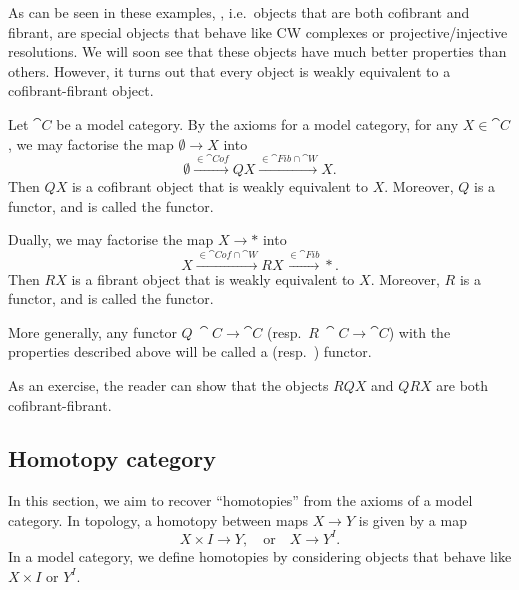As can be seen in these examples, 
, i.e.\ objects that are both cofibrant and fibrant,
are special objects that
behave like CW complexes or projective/injective resolutions.
We will soon see that these objects
have much better properties than others.
However, it turns out that every object
is weakly equivalent to a cofibrant-fibrant object.

\begin{construction}
    Let $\cat C$ be a model category.
    By the axioms for a model category,
    for any $X\in\cat C$, we may factorise the map $\emptyset\to X$ into
    \[ \emptyset\xrightarrow{\in\cat{Cof}}QX\xrightarrow{\in\cat{Fib}\cap\cat{W}}X. \]
    Then $QX$ is a cofibrant object that is weakly equivalent to $X$.
    Moreover, $Q$ is a functor, and is called the  functor.

    Dually, we may factorise the map $X\to *$ into
    \[ X\xrightarrow{\in\cat{Cof}\cap\cat{W}}RX\xrightarrow{\in\cat{Fib}}*. \]
    Then $RX$ is a fibrant object that is weakly equivalent to $X$.
    Moreover, $R$ is a functor, and is called the  functor.

    More generally, any functor $Q\:\cat{C}\to\cat{C}$
    (resp.\ $R\:\cat{C}\to\cat{C}$) with the properties described above
    will be called a  (resp.\ ) functor.

    As an exercise,
    the reader can show that the objects $RQX$ and $QRX$ are both cofibrant-fibrant. \varqed
\end{construction}

\subsection{Homotopy category}

In this section, we aim to recover ``homotopies'' from the axioms of a model category.
In topology, a homotopy between maps $X\to Y$ is given by a map
\[ X\times I\to Y,\quad\text{or}\quad X\to Y^I. \]
In a model category, we define homotopies
by considering objects that behave like $X\times I$ or $Y^I$.

